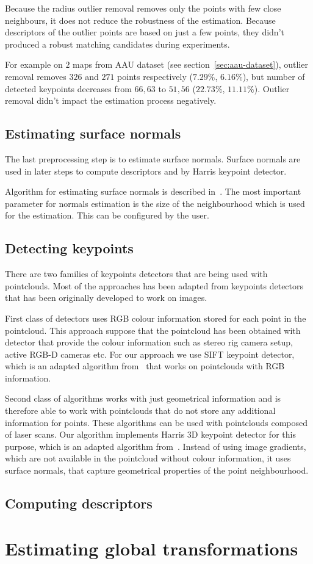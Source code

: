 Because the radius outlier removal removes only the points with few close neighbours, it does not reduce the robustness of the estimation. Because descriptors of the outlier points are based on just a few points, they didn't produced a robust matching candidates during experiments.

For example on $2$ maps from \gls{AAU} dataset (see section~\ref{sec:aau-dataset}), outlier removal removes $326$ and $271$ points respectively ($7.29\%$, $6.16\%$), but number of detected keypoints decreases from $66, 63$ to $51, 56$ ($22.73\%$, $11.11\%$). Outlier removal didn't impact the estimation process negatively.

\subsection{Estimating surface normals}

The last preprocessing step is to estimate surface normals. Surface normals are used in later steps to compute descriptors and by Harris keypoint detector.

Algorithm for estimating surface normals is described in~\cite{RusuDoctoralDissertation}. The most important parameter for normals estimation is the size of the neighbourhood which is used for the estimation. This can be configured by the user.

\subsection{Detecting keypoints}


There are two families of keypoints detectors that are being used with pointclouds. Most of the approaches has been adapted from keypoints detectors that has been originally developed to work on images.

First class of detectors uses RGB colour information stored for each point in the pointcloud. This approach suppose that the pointcloud has been obtained with detector that provide the colour information such as stereo rig camera setup, active RGB-D cameras etc. For our approach we use \gls{SIFT} keypoint detector, which is an adapted algorithm from~\cite{lowe2004distinctive} that works on pointclouds with RGB information.

Second class of algorithms works with just geometrical information and is therefore able to work with pointclouds that do not store any additional information for points. These algorithms can be used with pointclouds composed of laser scans. Our algorithm implements Harris 3D keypoint detector for this purpose, which is an adapted algorithm from~\cite{harris1988combined}. Instead of using image gradients, which are not available in the pointcloud without colour information, it uses surface normals, that capture geometrical properties of the point neighbourhood.

\subsection{Computing descriptors}



\section{Estimating global transformations}
\label{sec:estimate-global}